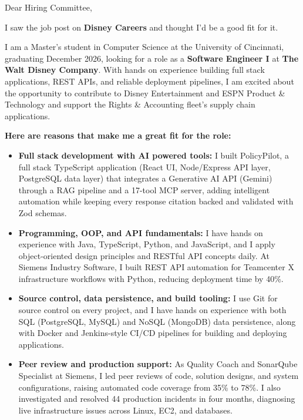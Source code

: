 \documentclass[11pt]{letter}
\date{}
\begin{document}
\begin{letter}{}

\opening{Dear Hiring Committee,}

I saw the job post on \textbf{Disney Careers} and thought I'd be a good fit for it.

I am a Master's student in Computer Science at the University of Cincinnati, graduating December 2026, looking for a role as a \textbf{Software Engineer I} at \textbf{The Walt Disney Company}. With hands on experience building full stack applications, REST APIs, and reliable deployment pipelines, I am excited about the opportunity to contribute to Disney Entertainment and ESPN Product \& Technology and support the Rights \& Accounting fleet's supply chain applications.

\textbf{Here are reasons that make me a great fit for the role:}

\begin{itemize}[leftmargin=*, itemsep=0.45em]
    \item \textbf{Full stack development with AI powered tools:} I built PolicyPilot, a full stack TypeScript application (React UI, Node/Express API layer, PostgreSQL data layer) that integrates a Generative AI API (Gemini) through a RAG pipeline and a 17-tool MCP server, adding intelligent automation while keeping every response citation backed and validated with Zod schemas.

    \item \textbf{Programming, OOP, and API fundamentals:} I have hands on experience with Java, TypeScript, Python, and JavaScript, and I apply object-oriented design principles and RESTful API concepts daily. At Siemens Industry Software, I built REST API automation for Teamcenter X infrastructure workflows with Python, reducing deployment time by 40\%.

    \item \textbf{Source control, data persistence, and build tooling:} I use Git for source control on every project, and I have hands on experience with both SQL (PostgreSQL, MySQL) and NoSQL (MongoDB) data persistence, along with Docker and Jenkins-style CI/CD pipelines for building and deploying applications.

    \item \textbf{Peer review and production support:} As Quality Coach and SonarQube Specialist at Siemens, I led peer reviews of code, solution designs, and system configurations, raising automated code coverage from 35\% to 78\%. I also investigated and resolved 44 production incidents in four months, diagnosing live infrastructure issues across Linux, EC2, and databases.
\end{itemize}


\end{letter}
\end{document}
